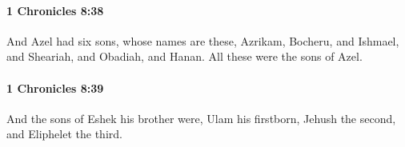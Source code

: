 		\paragraph{1 Chronicles 8:38} %
			\label{1CHRONICLES-8-38}

			And Azel had six sons, whose names are these, Azrikam, Bocheru, and Ishmael, and Sheariah, and Obadiah, and Hanan. All these were the sons of Azel.


		\paragraph{1 Chronicles 8:39} %
			\label{1CHRONICLES-8-39}

			And the sons of Eshek his brother were, Ulam his firstborn, Jehush the second, and Eliphelet the third.


